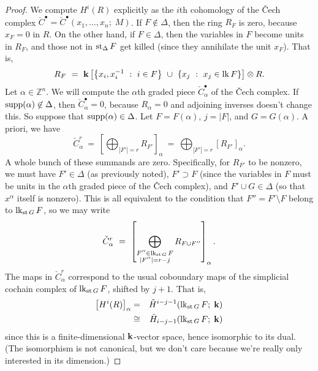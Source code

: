 \documentclass{amsart}
\renewcommand{\star}{\mathop{\rm st}\nolimits}
\newcommand{\link}{\mathop{\rm 
lk}\nolimits}
\newcommand{\sm}{\setminus}
\newcommand{\0}{\emptyset}
\newcommand{\CE}{\check{C}}
\newcommand{\supp}{\mathop{\rm supp}\nolimits}
\newcommand{\fld}{{\bf k}}
\newcommand{\ZZ}{{\mathbb Z}}
\newcommand{\isom}{\cong}
\begin{document}
\begin{proof}
We compute $H^i(R)$ explicitly as the $i$th cohomology of the \v{C}ech complex $\CE^\bullet
= \CE^\bullet(x_1, \dots, x_n ;\; M)$.  If $F \not\in \Delta$, then the ring $R_F$ is zero,
because $x_F=0$ in $R$.  On the other hand, if $F \in \Delta$, then the variables in $F$
become units in $R_F$, and those not in $\star_\Delta F$ get killed (since they annihilate the 
unit
$x_F$).  That is,
	$$R_F ~=~ \fld\left[ \left\{x_i,x_i^{-1} ~:~ i \in F\right\} ~\cup~
	\left\{x_j ~:~ x_j \in \link F \right\} \right] \otimes R.$$
Let $\alpha \in \ZZ^n$.  We will compute the $\alpha$th graded piece $\CE^\bullet_\alpha$ of
the \v{C}ech complex.  If $\supp(\alpha) \not\in \Delta$, then $\CE^\bullet_\alpha = 0$,
because $R_\alpha=0$ and adjoining inverses doesn't change this.  So suppose that
$\supp(\alpha) \in \Delta$.  Let $F = F(\alpha)$, $j=|F|$, and $G = G(\alpha)$.  A priori, we
have
	\begin{equation}
	\CE^r_\alpha ~=~ \left[ \bigoplus_{|F'|=r} R_{F'} \right]_\alpha
	~=~ \bigoplus_{|F'|=r} [R_{F'}]_\alpha.
	\end{equation}
A whole bunch of these summands are zero.  Specifically, for $R_{F'}$ to be nonzero, we must
have $F' \in \Delta$ (as previously noted), $F' \supset F$ (since the variables in $F$ must be
units in the $\alpha$th graded piece of the \v{C}ech complex), and $F' \cup G \in \Delta$ (so
that $x^\alpha$ itself is nonzero).  This is all equivalent to the condition that
$F'' = F' \sm F$ belong to $\link_{\star G} F$, so we may write
	\begin{equation}
	\CE^r_\alpha ~=~ \left[ \bigoplus_{\substack{F'' \in \link_{\star G} F \\ 
	|F''|=r-j}} R_{F \cup F''} \right]_\alpha.
	\end{equation}
The maps in $\CE^r_\alpha$ correspond to the usual coboundary maps of the simplicial 
cochain complex of $\link_{\star G} F$, shifted by $j+1$.  That is,
	\begin{eqnarray}
	\left[H^i(R)\right]_\alpha &=& \tilde H^{i-j-1}(\link_{\star G} F;\; \fld) \\
	&\isom& \tilde H_{i-j-1}(\link_{\star G} F;\; \fld)
	\end{eqnarray}
since this is a finite-dimensional $\fld$-vector space, hence isomorphic to its dual.  (The 
isomorphism is not canonical, but we don't care because we're really only interested in its 
dimension.)


\end{proof}
\end{document}
